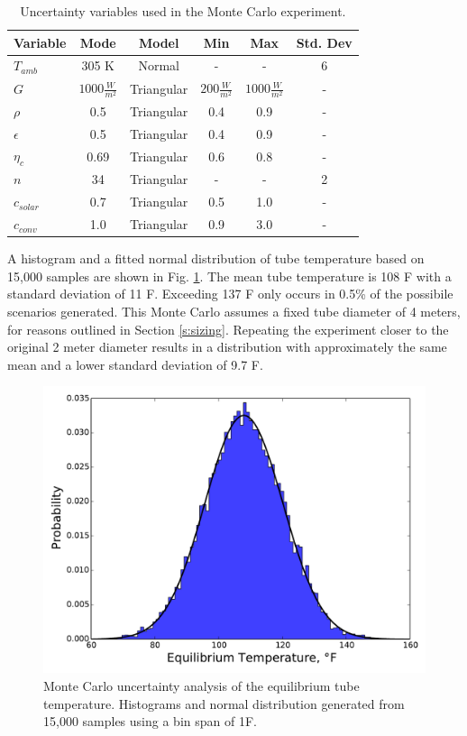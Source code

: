 \documentclass[heading.tex]{subfiles}
\begin{document}
\begin{table}[hbtp]

    \centering
    \caption{Uncertainty variables used in the Monte Carlo experiment.}
    \label{tab:montecarlo}
    \begin{tabulary}{1.0\textwidth}{l  c  c  c c c} 
        \hline
        Variable & Mode & Model & Min & Max & Std. Dev\\ \hline \hline
        $T_{amb}$ & 305 K & Normal & - & - & 6 \\ 
        $G$ & $1000\frac{W}{m^{2}}$ & Triangular & $200\frac{W}{m^{2}}$ & $1000\frac{W}{m^{2}}$ & - \\
        $\rho$ & 0.5 & Triangular & 0.4 & 0.9 & - \\
        $\epsilon$ & 0.5 & Triangular & 0.4 & 0.9 & - \\
        $\eta_{c}$ & 0.69 & Triangular & 0.6 & 0.8 & - \\
        $n$ & 34 & Triangular & - & - & 2 \\
        $c_{solar}$ & 0.7 & Triangular & 0.5 & 1.0 & - \\
        $c_{conv}$ & 1.0 & Triangular & 0.9 & 3.0 & - \\
        \hline
    \end{tabulary}
    
\end{table}


A histogram and a fitted normal distribution of tube temperature
based on 15,000 samples are shown in Fig. \ref{f:montecarlo}.
The mean tube temperature is 108 \degree F with a standard deviation of 11 \degree F.
Exceeding 137 \degree F only occurs in 0.5\% of the possibile scenarios generated.
This Monte Carlo assumes a fixed tube diameter of 4 meters,
for reasons outlined in Section \ref{s:sizing}.
Repeating the experiment closer to the original 2 meter diameter results in
a distribution with approximately the same mean and a lower standard deviation
of 9.7 \degree F.

\begin{figure}[hbtp]
\centering
\includegraphics[width=.9\textwidth]{images/histo.pdf}
 \caption[MonteCarlo]{Monte Carlo uncertainty analysis of the equilibrium tube temperature.
 Histograms and normal distribution generated from 15,000 samples
 using a bin span of 1\degree F.}
\label{f:montecarlo}
\end{figure}
\end{document}
